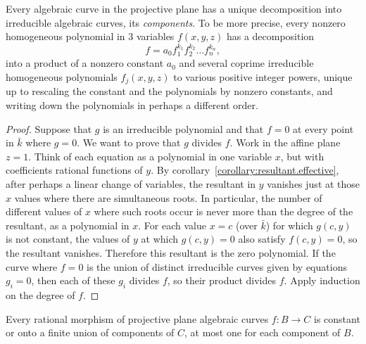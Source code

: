 \begin{theorem}[Study]\label{theorem:Study}
Every algebraic curve in the projective plane has a unique decomposition into irreducible algebraic curves, its \emph{components}.
To be more precise, every nonzero homogeneous polynomial in 3 variables \(f(x,y,z)\) has a decomposition
\[
f=a_0 f_1^{k_1} f_2^{k_2} \dots f_n^{k_n},
\]
into a product of a nonzero constant \(a_0\) and several coprime irreducible homogeneous polynomials \(f_j(x,y,z)\) to various positive integer powers, unique up to rescaling the constant and the polynomials by nonzero constants, and writing down the polynomials in perhaps a different order.
\end{theorem}
\begin{proof}
Suppose that \(g\) is an irreducible polynomial and that \(f=0\) at every point in \(\bar{k}\) where \(g=0\). 
We want to prove that \(g\) divides \(f\).
Work in the affine plane \(z=1\).
Think of each equation as a polynomial in one variable \(x\), but with coefficients rational functions of \(y\).
By corollary~\vref{corollary:resultant.effective}, after perhaps a linear change of variables, the resultant in \(y\) vanishes just at those \(x\) values where there are simultaneous roots.
In particular, the number of different values of \(x\) where such roots occur is never more than the degree of the resultant, as a polynomial in \(x\).
For each value \(x=c\) (over \(\bar{k}\)) for which \(g(c,y)\) is not constant, the values of \(y\) at which \(g(c,y)=0\) also satisfy \(f(c,y)=0\), so the resultant vanishes.
Therefore this resultant is the zero polynomial.
If the curve where \(f=0\) is the union of distinct irreducible curves given by equations \(g_i=0\), then each of these \(g_i\) divides \(f\), so their product divides \(f\).
Apply induction on the degree of \(f\).
\end{proof}
\begin{theorem}
Every rational morphism of projective plane algebraic curves \(f \colon B \to C\) is constant or onto a finite union of components of \(C\), at most one for each component of \(B\).
\end{theorem}

